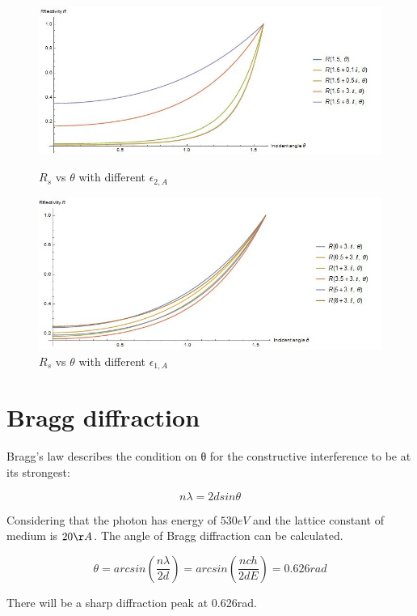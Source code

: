 \documentclass{article}
\begin{document}
		\begin{figure}
		\centering
			\begin{minipage}[b]{0.45\linewidth}
			\includegraphics[width=\linewidth]{fig3.jpg}
			\caption{$R_{s}$ vs $\theta$ with different $\epsilon_{2,A}$}
			\label{fig:minipage1}
			\end{minipage}
			\quad
			\begin{minipage}[b]{0.45\linewidth}
			\includegraphics[width=\linewidth]{fig4.jpg}
			\caption{$R_{s}$ vs $\theta$ with different $\epsilon_{1,A}$}
			\label{fig:minipage2}
			\end{minipage}
		\end{figure}

	\section{Bragg diffraction}

		
		Bragg's law describes the condition on θ for the constructive interference to be at its strongest:

		\begin{equation}
			n\lambda = 2dsin\theta
		\end{equation}

		Considering that the photon has energy of $530eV$ and the lattice constant of medium is $20\AA$. The angle of Bragg diffraction can be calculated.

		\begin{equation}
			\theta = arcsin(\frac{n\lambda}{2d}) = arcsin(\frac{nch}{2dE}) = 0.626rad
		\end{equation}

		There will be a sharp diffraction peak at 0.626rad.
\end{document}
